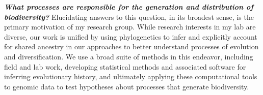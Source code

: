 \textbf{\textit{What processes are responsible for the generation and
        distribution of biodiversity?}}
Elucidating answers to this question, in its broadest sense, is the primary
motivation of my research group.
While research interests in my lab are diverse, our work is unified by
using
phylogenetics to infer and explicitly account for shared ancestry in our
approaches to better understand processes of evolution and diversification.
We use a broad suite of methods in this endeavor, including
field and lab work,
developing statistical methods and associated software for inferring evolutionary history,
and ultimately applying these computational tools to genomic data to test
hypotheses about processes that generate biodiversity.
